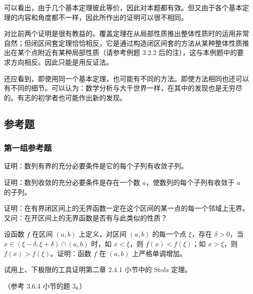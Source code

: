 \begin{xremark}
可以看出，由于几个基本定理彼此等价，因此对本题都有效。但又由于各个基本定理的内容和角度都不一样，因此所作出的证明可以很不相同。

对比前两个证明是很有教益的。覆盖定理在从局部性质推出整体性质时的运用非常自然；但闭区间套定理恰恰相反，它是通过构造闭区间套的方法从某种整体性质推出在某个点附近有某种局部性质（请参考例题 3.2.2 后的注），这与本例题中的要求方向相反。因此只能是用反证法。

还应看到，即使用同一个基本定理，也可能有不同的方法。即使方法相同也还可以有不同的细节。可以认为：数学分析与大千世界一样，在其中的发现也是无穷尽的。有志的初学者也可能作出新的发现。
\end{xremark}

\subsection{参考题}

\subsubsection*{第一组参考题}

\begin{xreferenceproblem}[1]
证明：数列有界的充分必要条件是它的每个子列有收敛子列。
\end{xreferenceproblem}

\begin{xreferenceproblem}[2]
证明：数列收敛的充分必要条件是存在一个数 $a$，使数列的每个子列有收敛于 $a$ 的子列。
\end{xreferenceproblem}

\begin{xreferenceproblem}[3]
证明：在有界闭区间上的无界函数一定在这个区间的某一点的每一个邻域上无界。又问：在开区间上的无界函数是否有与此类似的性质？
\end{xreferenceproblem}

\begin{xreferenceproblem}[4]
设函数 $f$ 在区间 $(a,b)$ 上定义，对区间 $(a,b)$ 的每一个点 $\xi$，存在 $\delta>0$，当 $x\in(\xi-\delta,\xi+\delta)\cap(a,b)$ 时，如 $x<\xi$，则 $f(x)<f(\xi)$；如 $x>\xi$，则 $f(x)>f(\xi)$。证明：函数 $f$ 在 $(a,b)$ 上严格单调增加。
\end{xreferenceproblem}

\begin{xreferenceproblem}[5]
试用上、下极限的工具证明第二章 2.4.1 小节中的 Stolz 定理。

  （参考 3.6.4 小节的题 3。）
\end{xreferenceproblem}

